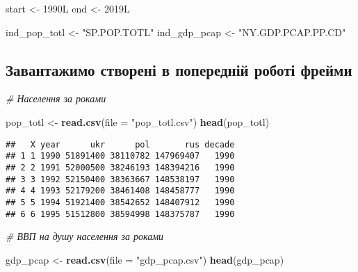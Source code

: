 \documentclass[
]{article}
\newenvironment{Shaded}{\begin{snugshade}}{\end{snugshade}}
\newcommand{\CommentTok}[1]{\textcolor[rgb]{0.56,0.35,0.01}{\textit{#1}}}
\newcommand{\DataTypeTok}[1]{\textcolor[rgb]{0.13,0.29,0.53}{#1}}
\newcommand{\KeywordTok}[1]{\textcolor[rgb]{0.13,0.29,0.53}{\textbf{#1}}}
\newcommand{\NormalTok}[1]{#1}
\newcommand{\StringTok}[1]{\textcolor[rgb]{0.31,0.60,0.02}{#1}}
\begin{document}
\begin{Shaded}
\begin{Highlighting}[]
\NormalTok{start <-}\StringTok{ }\NormalTok{1990L}
\NormalTok{end <-}\StringTok{ }\NormalTok{2019L}

\NormalTok{ind_pop_totl <-}\StringTok{ "SP.POP.TOTL"}
\NormalTok{ind_gdp_pcap <-}\StringTok{ "NY.GDP.PCAP.PP.CD"}
\end{Highlighting}
\end{Shaded}

\hypertarget{ux437ux430ux432ux430ux43dux442ux430ux436ux438ux43cux43e-ux441ux442ux432ux43eux440ux435ux43dux456-ux432-ux43fux43eux43fux435ux440ux435ux434ux43dux456ux439-ux440ux43eux431ux43eux442ux456-ux444ux440ux435ux439ux43cux438}{%
\subsection{Завантажимо створені в попередній роботі
фрейми}\label{ux437ux430ux432ux430ux43dux442ux430ux436ux438ux43cux43e-ux441ux442ux432ux43eux440ux435ux43dux456-ux432-ux43fux43eux43fux435ux440ux435ux434ux43dux456ux439-ux440ux43eux431ux43eux442ux456-ux444ux440ux435ux439ux43cux438}}

\begin{Shaded}
\begin{Highlighting}[]
\CommentTok{# Населення  за роками}

\NormalTok{pop_totl <-}\StringTok{ }\KeywordTok{read.csv}\NormalTok{(}\DataTypeTok{file =} \StringTok{"pop_totl.csv"}\NormalTok{)}
\KeywordTok{head}\NormalTok{(pop_totl)}
\end{Highlighting}
\end{Shaded}

\begin{verbatim}
##   X year      ukr      pol       rus decade
## 1 1 1990 51891400 38110782 147969407   1990
## 2 2 1991 52000500 38246193 148394216   1990
## 3 3 1992 52150400 38363667 148538197   1990
## 4 4 1993 52179200 38461408 148458777   1990
## 5 5 1994 51921400 38542652 148407912   1990
## 6 6 1995 51512800 38594998 148375787   1990
\end{verbatim}

\begin{Shaded}
\begin{Highlighting}[]
\CommentTok{# ВВП на душу населення  за роками}

\NormalTok{gdp_pcap <-}\StringTok{ }\KeywordTok{read.csv}\NormalTok{(}\DataTypeTok{file =} \StringTok{"gdp_pcap.csv"}\NormalTok{)}
\KeywordTok{head}\NormalTok{(gdp_pcap)}
\end{Highlighting}
\end{Shaded}
\end{document}
